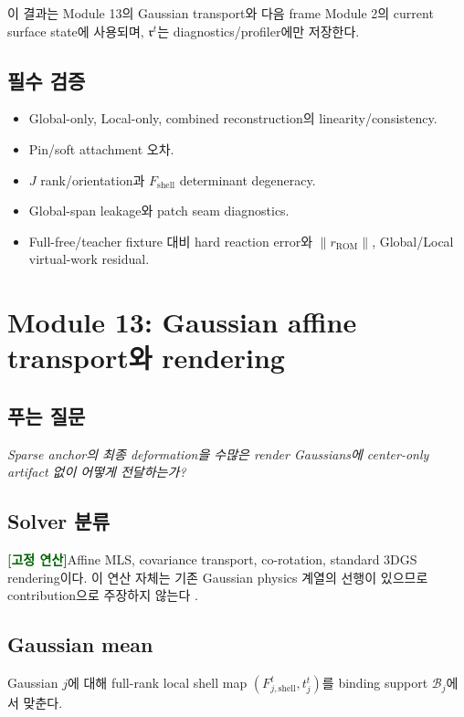 \documentclass[11pt,a4paper]{article}
\newcommand{\deterministic}{\textcolor{darkgreen}{\textbf{[고정 연산]}}}
\begin{document}
이 결과는 Module 13의 Gaussian transport와
다음 frame Module 2의 current surface state에 사용되며,
\(\mathfrak r^t\)는 diagnostics/profiler에만 저장한다.

\subsection*{필수 검증}

\begin{itemize}[leftmargin=1.5em]
  \item Global-only, Local-only, combined reconstruction의 linearity/consistency.
  \item Pin/soft attachment 오차.
  \item \(J\) rank/orientation과 \(F_{\mathrm{shell}}\) determinant degeneracy.
  \item Global-span leakage와 patch seam diagnostics.
  \item Full-free/teacher fixture 대비 hard reaction error와
  \(\|r_{\mathrm{ROM}}\|\), Global/Local virtual-work residual.
\end{itemize}

\section{Module 13: Gaussian affine transport와 rendering}

\subsection*{푸는 질문}

\emph{Sparse anchor의 최종 deformation을 수많은 render Gaussians에
center-only artifact 없이 어떻게 전달하는가?}

\subsection*{Solver 분류}

\deterministic Affine MLS, covariance transport, co-rotation,
standard 3DGS rendering이다.
이 연산 자체는 기존 Gaussian physics 계열의 선행이 있으므로 contribution으로 주장하지 않는다
\cite{xie2024physgaussian,yan2026gaussianswaying,shao2025gausim}.

\subsection*{Gaussian mean}

Gaussian \(j\)에 대해 full-rank local shell map \((F_{j,\mathrm{shell}}^t,t_j^t)\)를
binding support \(\mathcal B_j\)에서 맞춘다.
\end{document}
